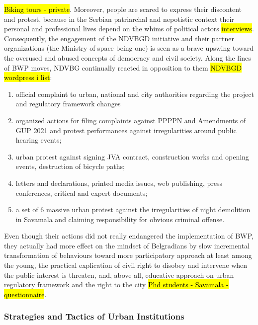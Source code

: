 \documentclass[11pt]{report}
\begin{document}
\hl{Biking tours - private}.
Moreover, people are scared to express their discontent and protest, because in the Serbian patriarchal and nepotistic context their personal and professional lives depend on the whims of political actors \hl{interviews}.
\\
Consequently, the engagement of the NDVBGD initiative and their partner organizations (the Ministry of space being one) is seen as a brave upswing toward the overused and abused concepts of democracy and civil society.
Along the lines of BWP moves, NDVBG continually reacted in opposition to them \hl{NDVBGD wordpress i list}:
\begin{enumerate}
\item official complaint to urban, national and city authorities regarding the project and regulatory framework changes
\item organized actions for filing complaints against PPPPN and Amendments of GUP 2021 and protest performances against irregularities around public hearing events;
\item urban protest against signing JVA contract, construction works and opening events, destruction of bicycle paths;
\item letters and declarations, printed media issues, web publishing, press conferences, critical and expert documents;
\item a set of 6 massive urban protest against the irregularities of night demolition in Savamala and claiming responsibility for obvious criminal offense. 
\end{enumerate}

Even though their actions did not really endangered the implementation of BWP, they actually had more effect on the mindset of Belgradians by slow incremental transformation of behaviours toward more participatory approach at least among the young, the practical explication of civil right to disobey and intervene when the public interest is threaten, and, above all, educative approach on urban regulatory framework and the right to the city
\hl{Phd students - Savamala - questionnaire}.

\subsubsection{Strategies and Tactics of Urban Institutions}
\end{document}
